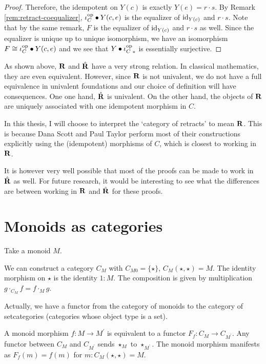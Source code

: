 \begin{proof}
  Therefore, the idempotent on $ Y(c) $ is exactly $ Y(e) = r \cdot s $. By Remark \ref{rem:retract-coequalizer}, $ \iota_C^{\text{op}} \bullet Y(c, e) $ is the equalizer of $ \text{id}_{Y(c)} $ and $ r \cdot s $. Note that by the same remark, $ F $ is the equalizer of $ \text{id}_{Y(c)} $ and $ r \cdot s $ as well. Since the equalizer is unique up to unique isomorphism, we have an isomorphism $ F \cong \iota_C^{\text{op}} \bullet Y(c, e) $ and we see that $ Y \bullet {\ensuremath{\iota_C^{\text{op}}}}_* $ is essentially surjective.
\end{proof}

\begin{remark}
  As shown above, $ \mathbf{R} $ and $ \hat {\mathbf{R}} $ have a very strong relation. In classical mathematics, they are even equivalent. However, since $ \mathbf{R} $ is not univalent, we do not have a full equivalence in univalent foundations and our choice of definition will have consequences. One one hand, $ \hat {\mathbf{R}} $ is univalent. On the other hand, the objects of $ \mathbf{R} $ are uniquely associated with one idempotent morphism in $ C $.

  In this thesis, I will choose to interpret the `category of retracts' to mean $ \mathbf{R} $. This is because Dana Scott and Paul Taylor perform most of their constructions explicitly using the (idempotent) morphisms of $ C $, which is closest to working in $ \mathbf{R} $.

  It is however very well possible that most of the proofs can be made to work in $ \hat {\mathbf{R}} $ as well. For future research, it would be interesting to see what the differences are between working in $ \mathbf{R} $ and $ \hat {\mathbf{R}} $ for these proofs.
\end{remark}

\section{Monoids as categories}\label{sec:monoid-category}
Take a monoid $ M $.
\begin{definition}
  We can construct a category $ C_M $ with $ C_{M0} = \{ \star \} $, $ C_M(\star, \star) = M $. The identity morphism on $ \star $ is the identity $ 1: M $. The composition is given by multiplication $ g \cdot_{C_M} f = f \cdot_M g $.
\end{definition}

\begin{remark}
  Actually, we have a functor from the category of monoids to the category of setcategories (categories whose object type is a set).

  A monoid morphism $ f: M \to M^\prime $ is equivalent to a functor $ F_f: C_M \to C_{M^\prime} $. Any functor between $ C_M $ and $ C_{M^\prime} $ sends $ \star_M $ to $ \star_{M^\prime} $. The monoid morphism manifests as $ F_f(m) = f(m) $ for $ m: C_M(\star, \star) = M $.
\end{remark}

